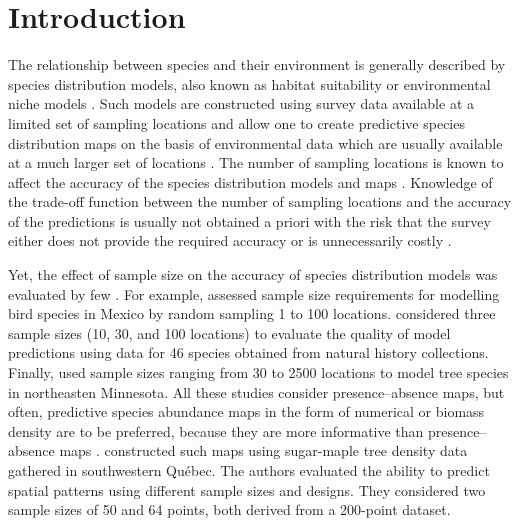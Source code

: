 \documentclass[review]{elsarticle}
\begin{document}
\linenumbers

\section{Introduction}

The relationship between species and their environment is generally described by species distribution models, also known as habitat suitability or environmental niche models \citep{guisan2005}. Such models are constructed using survey data available at a limited set of sampling locations and allow one to create predictive species distribution maps on the basis of environmental data which are usually available at a much larger set of locations \citep{guisan2000}. The number of sampling locations is known to affect the accuracy of the species distribution models and maps \citep{stockwell2002, wisz2008}.  Knowledge of the trade-off function between the number of sampling locations and the accuracy of the predictions is usually not obtained a priori  with the risk that the survey either does not provide the required accuracy or is unnecessarily costly \citep{caughlan2001,reynolds2011}.

Yet, the effect of sample size on the accuracy of species distribution models was evaluated by few \citep[see e.g.][]{stockwell2002,pearson2007,wisz2008,hanberry2012}. For example, \citet{stockwell2002} assessed sample size requirements for modelling bird species in Mexico by random sampling 1 to 100 locations. \citet{wisz2008} considered three sample sizes (10, 30, and 100 locations) to evaluate the quality of model predictions using data for 46 species obtained from natural history collections. Finally, \citet{hanberry2012} used sample sizes ranging from 30 to 2500 locations to model tree species in northeasten  Minnesota. All these studies consider presence--absence maps, but often, predictive species abundance maps in the form of numerical or biomass density are to be preferred,  because they are more informative than presence--absence maps \citep{vieira2012, cozzi2013}.  \citet{fortin1989} constructed such maps using sugar-maple tree density data gathered in  southwestern Qu\'{e}bec.  The authors evaluated the ability to predict spatial patterns using different sample sizes and designs. They considered two sample sizes of 50 and 64 points, both derived from a 200-point dataset.
\end{document}
